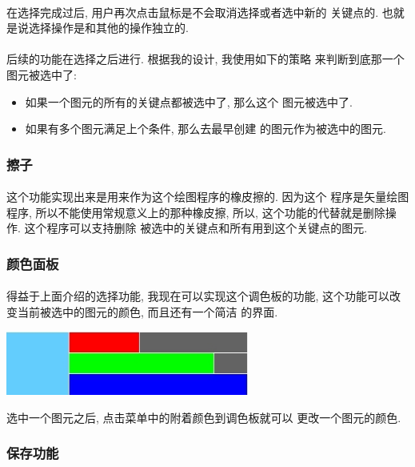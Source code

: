 \documentclass{article}
\begin{document}
			\paragraph{}
				在选择完成过后, 用户再次点击鼠标是不会取消选择或者选中新的
				关键点的. 也就是说选择操作是和其他的操作独立的. 
			\paragraph{}
				后续的功能在选择之后进行. 根据我的设计, 我使用如下的策略
				来判断到底那一个图元被选中了:
				\begin{itemize}
					\item 如果一个图元的所有的关键点都被选中了, 那么这个
					      图元被选中了.
					\item 如果有多个图元满足上个条件, 那么去最早创建
					      的图元作为被选中的图元.
				\end{itemize}
		\subsubsection{擦子}
			\paragraph{}
				这个功能实现出来是用来作为这个绘图程序的橡皮擦的. 因为这个
				程序是矢量绘图程序, 所以不能使用常规意义上的那种橡皮擦, 
				所以, 这个功能的代替就是删除操作. 这个程序可以支持删除
				被选中的关键点和所有用到这个关键点的图元.
		\subsubsection{颜色面板}
			\paragraph{}
				得益于上面介绍的选择功能, 我现在可以实现这个调色板的功能,
				这个功能可以改变当前被选中的图元的颜色, 而且还有一个简洁
				的界面.
				\begin{center}
					\includegraphics[width = 8cm]{color.jpeg} \\
				\end{center}
				选中一个图元之后, 点击菜单中的附着颜色到调色板就可以
				更改一个图元的颜色.
		\subsubsection{保存功能}
\end{document}
